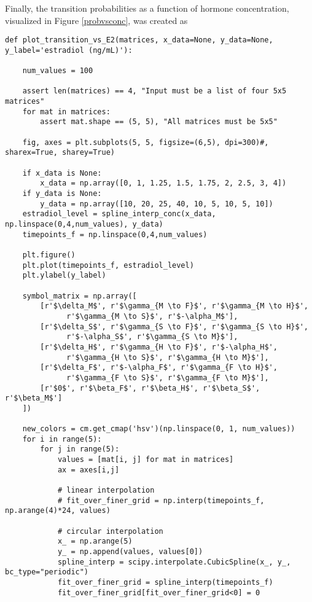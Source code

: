 \documentclass[11pt]{article}
\begin{document}
Finally, the transition probabilities as a function of hormone concentration, visualized in Figure \ref{probvsconc}, was created as
\begin{Verbatim}[frame=single]
def plot_transition_vs_E2(matrices, x_data=None, y_data=None, y_label='estradiol (ng/mL)'):

    num_values = 100

    assert len(matrices) == 4, "Input must be a list of four 5x5 matrices"
    for mat in matrices:
        assert mat.shape == (5, 5), "All matrices must be 5x5"

    fig, axes = plt.subplots(5, 5, figsize=(6,5), dpi=300)#, sharex=True, sharey=True)

    if x_data is None:
        x_data = np.array([0, 1, 1.25, 1.5, 1.75, 2, 2.5, 3, 4])
    if y_data is None:
        y_data = np.array([10, 20, 25, 40, 10, 5, 10, 5, 10])
    estradiol_level = spline_interp_conc(x_data, np.linspace(0,4,num_values), y_data)
    timepoints_f = np.linspace(0,4,num_values)

    plt.figure()
    plt.plot(timepoints_f, estradiol_level)
    plt.ylabel(y_label)
    
    symbol_matrix = np.array([
        [r'$\delta_M$', r'$\gamma_{M \to F}$', r'$\gamma_{M \to H}$', 
              r'$\gamma_{M \to S}$', r'$-\alpha_M$'],
        [r'$\delta_S$', r'$\gamma_{S \to F}$', r'$\gamma_{S \to H}$',
              r'$-\alpha_S$', r'$\gamma_{S \to M}$'],
        [r'$\delta_H$', r'$\gamma_{H \to F}$', r'$-\alpha_H$',
              r'$\gamma_{H \to S}$', r'$\gamma_{H \to M}$'],
        [r'$\delta_F$', r'$-\alpha_F$', r'$\gamma_{F \to H}$',
              r'$\gamma_{F \to S}$', r'$\gamma_{F \to M}$'],
        [r'$0$', r'$\beta_F$', r'$\beta_H$', r'$\beta_S$', r'$\beta_M$']
    ])
    
    new_colors = cm.get_cmap('hsv')(np.linspace(0, 1, num_values))
    for i in range(5):
        for j in range(5):
            values = [mat[i, j] for mat in matrices]
            ax = axes[i,j]

            # linear interpolation
            # fit_over_finer_grid = np.interp(timepoints_f, np.arange(4)*24, values)

            # circular interpolation
            x_ = np.arange(5)
            y_ = np.append(values, values[0])
            spline_interp = scipy.interpolate.CubicSpline(x_, y_, bc_type="periodic")
            fit_over_finer_grid = spline_interp(timepoints_f)
            fit_over_finer_grid[fit_over_finer_grid<0] = 0


\end{Verbatim}
\end{document}
